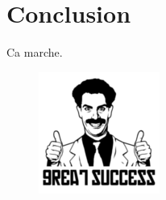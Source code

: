 \documentclass[a4paper,11pt]{article}
\begin{document}
\section{Conclusion} %

Ca marche. \newline
\begin{figure}[h]
    \includegraphics{great_success.png} 
\end{figure}




\end{document}
